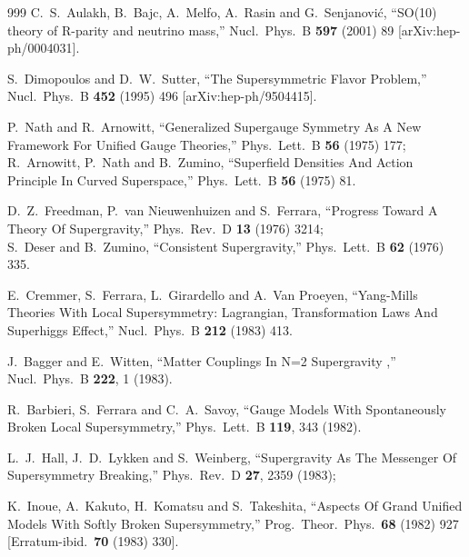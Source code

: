 \begin{thebibliography}{999}
  C.~S.~Aulakh, B.~Bajc, A.~Melfo, A.~Rasin and G.~Senjanovi\'c,
  ``SO(10) theory of R-parity and neutrino mass,''
  Nucl.\ Phys.\ B {\bf 597} (2001) 89
  [arXiv:hep-ph/0004031].

  S.~Dimopoulos and D.~W.~Sutter,
  ``The Supersymmetric Flavor Problem,''
  Nucl.\ Phys.\ B {\bf 452} (1995) 496
  [arXiv:hep-ph/9504415].

  P.~Nath and R.~Arnowitt,
  ``Generalized Supergauge Symmetry As A New Framework For Unified Gauge
  Theories,''
  Phys.\ Lett.\ B {\bf 56} (1975) 177;
  R.~Arnowitt, P.~Nath and B.~Zumino,
  ``Superfield Densities And Action Principle In Curved Superspace,''
  Phys.\ Lett.\ B {\bf 56} (1975) 81.

  D.~Z.~Freedman, P.~van Nieuwenhuizen and S.~Ferrara,
  ``Progress Toward A Theory Of Supergravity,''
  Phys.\ Rev.\ D {\bf 13} (1976) 3214;
\\
 S.~Deser and B.~Zumino,
  ``Consistent Supergravity,''
  Phys.\ Lett.\ B {\bf 62} (1976) 335.

  E.~Cremmer, S.~Ferrara, L.~Girardello and A.~Van Proeyen,
  ``Yang-Mills Theories With Local Supersymmetry: Lagrangian, Transformation
  Laws And Superhiggs Effect,''
  Nucl.\ Phys.\ B {\bf 212} (1983) 413.

  J.~Bagger and E.~Witten,
  ``Matter Couplings In N=2 Supergravity ,''
  Nucl.\ Phys.\ B {\bf 222}, 1 (1983).

  R.~Barbieri, S.~Ferrara and C.~A.~Savoy,
  ``Gauge Models With Spontaneously Broken Local Supersymmetry,''
  Phys.\ Lett.\ B {\bf 119}, 343 (1982).

  L.~J.~Hall, J.~D.~Lykken and S.~Weinberg,
  ``Supergravity As The Messenger Of Supersymmetry Breaking,''
  Phys.\ Rev.\ D {\bf 27}, 2359 (1983);

  K.~Inoue, A.~Kakuto, H.~Komatsu and S.~Takeshita,
  ``Aspects Of Grand Unified Models With Softly Broken Supersymmetry,''
  Prog.\ Theor.\ Phys.\  {\bf 68} (1982) 927
  [Erratum-ibid.\  {\bf 70} (1983) 330].


\end{thebibliography}
